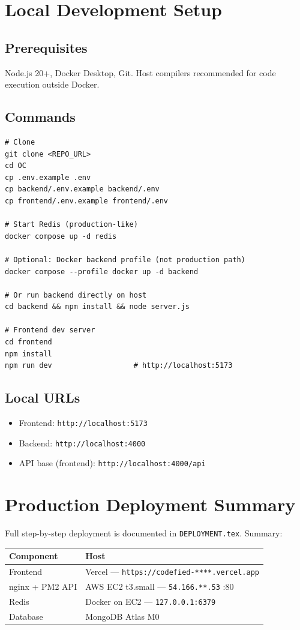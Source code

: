 \documentclass[11pt,a4paper]{article}
\newcommand{\maskedvercel}{\texttt{https://codefied-****.vercel.app}}
\newcommand{\maskedecip}{\texttt{54.166.**.53}}
\begin{document}
\section{Local Development Setup}

\subsection{Prerequisites}
Node.js 20+, Docker Desktop, Git. Host compilers recommended for code execution outside Docker.

\subsection{Commands}
\begin{lstlisting}[style=terminal]
# Clone
git clone <REPO_URL>
cd OC
cp .env.example .env
cp backend/.env.example backend/.env
cp frontend/.env.example frontend/.env

# Start Redis (production-like)
docker compose up -d redis

# Optional: Docker backend profile (not production path)
docker compose --profile docker up -d backend

# Or run backend directly on host
cd backend && npm install && node server.js

# Frontend dev server
cd frontend
npm install
npm run dev                   # http://localhost:5173
\end{lstlisting}

\subsection{Local URLs}
\begin{itemize}[noitemsep]
  \item Frontend: \texttt{http://localhost:5173}
  \item Backend: \texttt{http://localhost:4000}
  \item API base (frontend): \texttt{http://localhost:4000/api}
\end{itemize}

\section{Production Deployment Summary}

Full step-by-step deployment is documented in \texttt{DEPLOYMENT.tex}. Summary:

\begin{table}[h]
\centering
\small
\begin{tabular}{@{}ll@{}}
\toprule
\textbf{Component} & \textbf{Host} \\
\midrule
Frontend & Vercel --- \maskedvercel \\
nginx + PM2 API & AWS EC2 t3.small --- \maskedecip{} :80 \\
Redis & Docker on EC2 --- \texttt{127.0.0.1:6379} \\
Database & MongoDB Atlas M0 \\
\bottomrule
\end{tabular}
\end{table}
\end{document}
